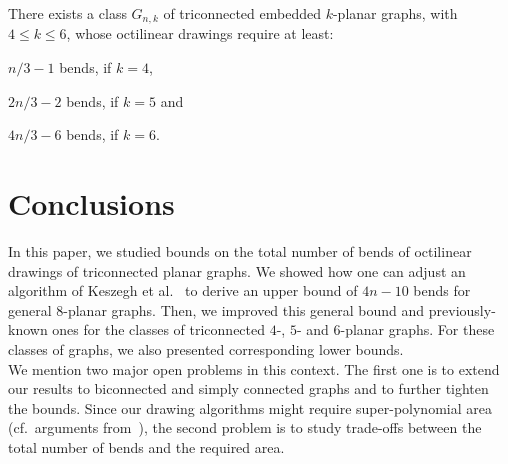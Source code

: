 \documentclass[a4paper,twoside,11pt]{article}
\begin{document}
\begin{theorem}
There exists a class $G_{n,k}$ of triconnected embedded $k$-planar
graphs, with $4 \leq k \leq 6$, whose octilinear drawings
require at least:
\begin{inparaenum}[(i)]
  \item $n/3-1$ bends, if $k=4$,
  \item $2n/3-2$ bends, if $k=5$ and
  \item $4n/3-6$ bends, if $k=6$.
\end{inparaenum}
\label{thm:lb}
\end{theorem}



\section{Conclusions}
\label{sec:conclusions}


In this paper, we studied bounds on the total number of bends of octilinear
drawings of triconnected planar graphs. We showed how one can adjust an
algorithm of Keszegh et al.~\cite{KPP13} to derive an upper bound of $4n-10$
bends for general $8$-planar graphs.
Then, we improved this general bound and previously-known ones for the classes
of triconnected $4$-, $5$- and $6$-planar graphs. For these classes of graphs,
we also presented corresponding lower bounds.\\
We mention two major open problems in this context. The first one is to extend
our results to biconnected and simply connected graphs and to further tighten
the bounds. Since our drawing algorithms might require super-polynomial area
(cf.~arguments from~\cite{BGKK14}), the second problem is to study trade-offs
between the total number of bends and the required area.





\end{document}
